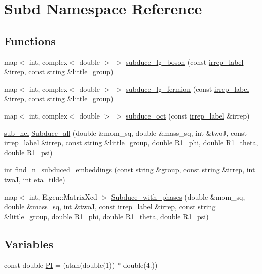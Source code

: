 \hypertarget{namespaceSubd}{}\section{Subd Namespace Reference}
\label{namespaceSubd}
\subsection*{Functions}
\begin{DoxyCompactItemize}
\item 
map$<$ int, complex$<$ double $>$ $>$ \mbox{\hyperlink{namespaceSubd_a5f31b3ef70ad25320a8010ec3017eb04}{subduce\+\_\+lg\+\_\+boson}} (const \mbox{\hyperlink{structirrep__label}{irrep\+\_\+label}} \&irrep, const string \&little\+\_\+group)
\item 
map$<$ int, complex$<$ double $>$ $>$ \mbox{\hyperlink{namespaceSubd_ae7ed68270fb8f7b5f574db245b085586}{subduce\+\_\+lg\+\_\+fermion}} (const \mbox{\hyperlink{structirrep__label}{irrep\+\_\+label}} \&irrep, const string \&little\+\_\+group)
\item 
map$<$ int, complex$<$ double $>$ $>$ \mbox{\hyperlink{namespaceSubd_aa8b77162377de658856d44a4ac5aad26}{subduce\+\_\+oct}} (const \mbox{\hyperlink{structirrep__label}{irrep\+\_\+label}} \&irrep)
\item 
\mbox{\hyperlink{structsub__hel}{sub\+\_\+hel}} \mbox{\hyperlink{namespaceSubd_ae0133abbe7b9e31a6eafd50c5a2320e3}{Subduce\+\_\+all}} (double \&mom\+\_\+sq, double \&mass\+\_\+sq, int \&twoJ, const \mbox{\hyperlink{structirrep__label}{irrep\+\_\+label}} \&irrep, const string \&little\+\_\+group, double R1\+\_\+phi, double R1\+\_\+theta, double R1\+\_\+psi)
\item 
int \mbox{\hyperlink{namespaceSubd_a7a3fcd97f1cf40eb963e278240d0ff3e}{find\+\_\+n\+\_\+subduced\+\_\+embeddings}} (const string \&group, const string \&irrep, int twoJ, int eta\+\_\+tilde)
\item 
map$<$ int, Eigen\+::\+Matrix\+Xcd $>$ \mbox{\hyperlink{namespaceSubd_a859ba9599493e5fa5957acedc92dd964}{Subduce\+\_\+with\+\_\+phases}} (double \&mom\+\_\+sq, double \&mass\+\_\+sq, int \&twoJ, const \mbox{\hyperlink{structirrep__label}{irrep\+\_\+label}} \&irrep, const string \&little\+\_\+group, double R1\+\_\+phi, double R1\+\_\+theta, double R1\+\_\+psi)
\end{DoxyCompactItemize}
\subsection*{Variables}
\begin{DoxyCompactItemize}
\item 
const double \mbox{\hyperlink{namespaceSubd_ace729813ef603fd0775fe11788d9ad07}{PI}} = (atan(double(1)) $\ast$ double(4.))
\end{DoxyCompactItemize}


